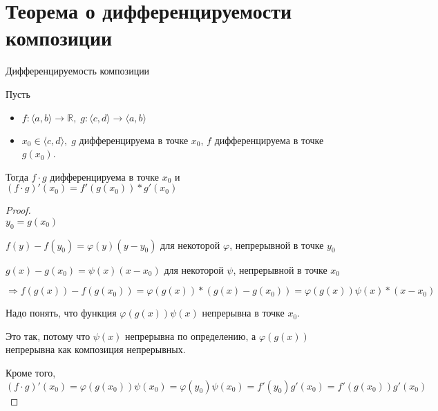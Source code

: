 \section{Теорема о дифференцируемости композиции \href{https://youtu.be/OXDjegAsmSU?t=2865}{\Walley}}
\begin{theorem-non} 
    Дифференцируемость композиции

    Пусть 
    \begin{itemize}
        \item $f: \langle a, b \rangle \to \mathbb{R}, \; g: \langle c, d \rangle \to \langle a, b \rangle$
        \item $x_0 \in \langle c, d \rangle, \; g$ дифференцируема в точке $x_0$, $f$ дифференцируема в точке $g(x_0)$.
    \end{itemize}

    Тогда $f \cdot g$ дифференцируема в точке $x_0$ и $(f \cdot g)'(x_0) = f'(g(x_0)) * g'(x_0)$
\end{theorem-non}
\begin{proof} \quad \\
    $y_0 = g(x_0)$

    $f(y) - f(y_0) = \varphi(y)(y - y_0)$ для некоторой $\varphi$, непрерывной в точке $y_0$

    $g(x) - g(x_0) = \psi(x)(x - x_0)$ для некоторой $\psi$, непрерывной в точке $x_0$

    $\Rightarrow f(g(x)) - f(g(x_0)) = \varphi(g(x)) * (g(x) - g(x_0)) = \varphi(g(x))\psi(x) * (x - x_0)$

    Надо понять, что функция $\varphi(g(x))\psi(x)$ непрерывна в точке $x_0$.

    Это так, потому что $\psi(x)$ непрерывна по определению, а $\varphi(g(x))$ непрерывна как композиция непрерывных.

    Кроме того, $(f \cdot g)'(x_0) = \varphi(g(x_0))\psi(x_0) = \varphi(y_0)\psi(x_0) = f'(y_0)g'(x_0) = f'(g(x_0))g'(x_0)$
\end{proof}
